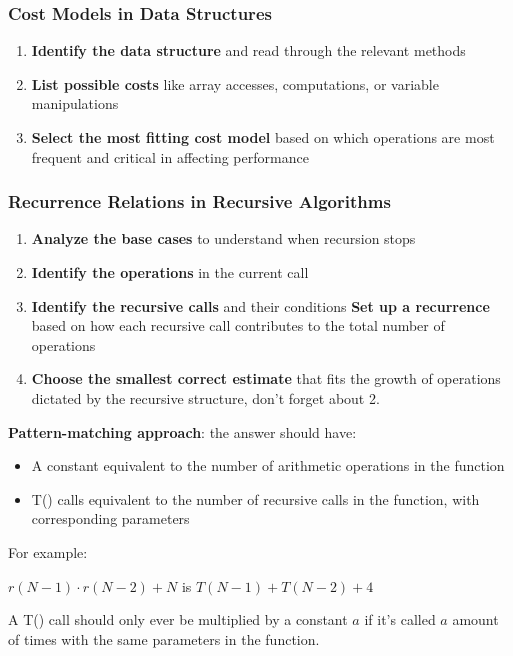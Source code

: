 \documentclass{article}
\begin{document}
\subsubsection{Cost Models in Data Structures}

\begin{enumerate}
    \item \textbf{Identify the data structure} and read through the relevant methods
    \item \textbf{List possible costs} like array accesses, computations, or variable manipulations
    \item \textbf{Select the most fitting cost model} based on which operations are most frequent and critical in affecting performance
\end{enumerate}

\subsubsection{Recurrence Relations in Recursive Algorithms}

\begin{enumerate}
    \item \textbf{Analyze the base cases} to understand when recursion stops
    \item \textbf{Identify the operations} in the current call
    \item \textbf{Identify the recursive calls} and their conditions
    \textbf{Set up a recurrence} based on how each recursive call contributes to the total number of operations
    \item \textbf{Choose the smallest correct estimate} that fits the growth of operations dictated by the recursive structure, don't forget about 2.
\end{enumerate}

\textbf{Pattern-matching approach}: the answer should have:
\begin{itemize}
    \item A constant equivalent to the number of arithmetic operations in the function
    \item T() calls equivalent to the number of recursive calls in the function, with corresponding parameters
\end{itemize}

For example:

$r(N-1) \cdot r(N-2) + N$ is $T(N-1) + T(N-2) + 4$

A T() call should only ever be multiplied by a constant $a$ if it's called $a$ amount of times with the same parameters in the function.
\end{document}

